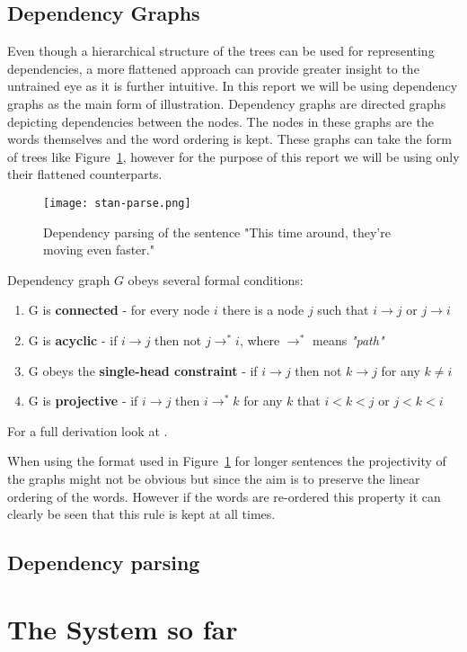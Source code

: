 \documentclass[bsc,frontabs,twoside,singlespacing,parskip,deptrepor]{infthesis}
\begin{document}
\section{Dependency Graphs}
Even though a hierarchical structure of the trees can be used for representing dependencies, a more flattened approach can provide greater insight to the untrained eye as it is further intuitive. In this report we will be using dependency graphs as the main form of illustration. Dependency graphs are directed graphs depicting dependencies between the nodes. The nodes in these graphs are the words themselves and the word ordering is kept. These graphs can take the form of trees like Figure~\ref{fig:stanford_pic}, however for the purpose of this report we will be using only their flattened counterparts.

\begin{figure}[H]
\centering
\texttt{[image: stan-parse.png]}
\caption{Dependency parsing of the sentence "This time around, they're moving even faster." \cite{P9}}
\label{fig:stanford_pic}
\end{figure}

Dependency graph $G$ obeys several formal conditions:
\begin{enumerate}
\item G is \textbf{connected} - for every node $i$ there is a node $j$ such that $i \to j$ or $j \to i$
\item G is \textbf{acyclic} - if $i \to j$ then not $j \to^* i$, where $\to^*$ means \textit{"path"}
\item G obeys the \textbf{single-head constraint} - if $i \to j$ then not $k \to j$ for any $ k \neq i$
\item G is \textbf{projective} - if $i \to j$ then $i \to^* k$ for any $k$ that $i < k < j$ or $j < k < i$
\end{enumerate}
For a full derivation look at \cite[Page 47]{P7}.

When using the format used in Figure~\ref{fig:stanford_pic} for longer sentences the projectivity of the graphs might not be obvious but since the aim is to preserve the linear ordering of the words. However if the words are re-ordered this property it can clearly be seen that this rule is kept at all times.


\section{Dependency parsing}


\chapter{The System so far}
\end{document}
